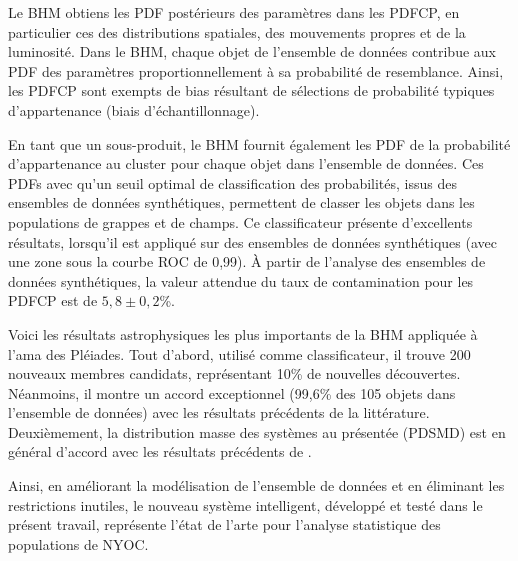 Le BHM obtiens les PDF postérieurs des paramètres dans les PDFCP, en particulier ces des distributions spatiales, des mouvements propres et de la luminosité. Dans le BHM, chaque objet de l'ensemble de données contribue aux PDF des paramètres proportionnellement à sa probabilité de resemblance. Ainsi, les PDFCP sont exempts de bias résultant de sélections de probabilité typiques d'appartenance (biais d'échantillonnage).

En tant que un sous-produit, le BHM fournit également les PDF de la probabilité d'appartenance au cluster pour chaque objet dans l'ensemble de données. Ces PDFs avec qu'un seuil optimal de classification des probabilités, issus des ensembles de données synthétiques, permettent de classer les objets dans les populations de grappes et de champs. Ce classificateur présente d'excellents résultats, lorsqu'il est appliqué sur des ensembles de données synthétiques (avec une zone sous la courbe ROC de 0,99). À partir de l'analyse des ensembles de données synthétiques, la valeur attendue du taux de contamination pour les PDFCP est de $5,8 \pm 0,2$\%.

Voici les résultats astrophysiques les plus importants de la BHM appliquée à l'ama des Pléiades. Tout d'abord, utilisé comme classificateur, il trouve 200 nouveaux membres candidats, représentant 10\% de nouvelles découvertes. Néanmoins, il montre un accord exceptionnel (99,6\% des 105 objets dans l'ensemble de données) avec les résultats précédents de la littérature. Deuxièmement, la distribution masse des systèmes au présentée (PDSMD) est en général d'accord avec les résultats précédents de \citet{Bouy2015}.

Ainsi, en améliorant la modélisation de l'ensemble de données et en éliminant les restrictions inutiles, le nouveau système intelligent, développé et testé dans le présent travail, représente l'état de l'arte pour l'analyse statistique des populations de NYOC.

